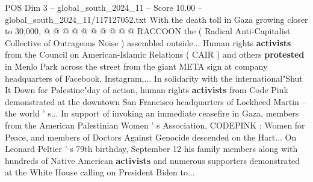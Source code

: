 \begin{textsample}{POS Dim 3 – global\_south\_2024\_11 – Score 10.00 – global\_south\_2024\_11/117127052.txt}
With the death toll in Gaza growing closer to 30,000, @ @ @ @ @ @ @ @ @ @ RACCOON the ( Radical Anti-Capitalist Collective of Outrageous Noise ) assembled outside...
Human rights \textbf{activists} from the Council on American-Islamic Relations ( CAIR ) and others \textbf{protested} in Menlo Park across the street from the giant META sign at company headquarters of Facebook, Instagram,...
In solidarity with the international"Shut It Down for Palestine"day of action, human rights \textbf{activists} from Code Pink demonstrated at the downtown San Francisco headquarters of Lockheed Martin -- the world ' s...
In support of invoking an immediate ceasefire in Gaza, members from the American Palestinian Women ' s Association, CODEPINK : Women for Peace, and members of Doctors Against Genocide descended on the Hart...
On Leonard Peltier ' s 79th birthday, September 12 his family members along with hundreds of Native American \textbf{activists} and numerous supporters demonstrated at the White House calling on President Biden to...

\end{textsample}
